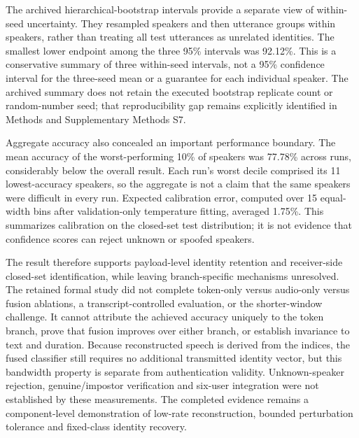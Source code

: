 The archived hierarchical-bootstrap intervals provide a separate view of within-seed uncertainty. They resampled speakers and then utterance groups within speakers, rather than treating all test utterances as unrelated identities. The smallest lower endpoint among the three 95\% intervals was 92.12\%. This is a conservative summary of three within-seed intervals, not a 95\% confidence interval for the three-seed mean or a guarantee for each individual speaker. The archived summary does not retain the executed bootstrap replicate count or random-number seed; that reproducibility gap remains explicitly identified in Methods and Supplementary Methods S7.

Aggregate accuracy also concealed an important performance boundary. The mean accuracy of the worst-performing 10\% of speakers was 77.78\% across runs, considerably below the overall result. Each run's worst decile comprised its 11 lowest-accuracy speakers, so the aggregate is not a claim that the same speakers were difficult in every run. Expected calibration error, computed over 15 equal-width bins after validation-only temperature fitting, averaged 1.75\%. This summarizes calibration on the closed-set test distribution; it is not evidence that confidence scores can reject unknown or spoofed speakers.

The result therefore supports payload-level identity retention and receiver-side closed-set identification, while leaving branch-specific mechanisms unresolved. The retained formal study did not complete token-only versus audio-only versus fusion ablations, a transcript-controlled evaluation, or the shorter-window challenge. It cannot attribute the achieved accuracy uniquely to the token branch, prove that fusion improves over either branch, or establish invariance to text and duration. Because reconstructed speech is derived from the indices, the fused classifier still requires no additional transmitted identity vector, but this bandwidth property is separate from authentication validity. Unknown-speaker rejection, genuine/impostor verification and six-user integration were not established by these measurements. The completed evidence remains a component-level demonstration of low-rate reconstruction, bounded perturbation tolerance and fixed-class identity recovery.
